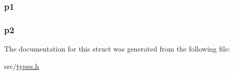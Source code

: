 \subsubsection[{\texorpdfstring{p1}{p1}}]{ p1}\hypertarget{struct_m_b_r_aece77b6cba572ad1536ef0f6ce20cb82}{}\label{struct_m_b_r_aece77b6cba572ad1536ef0f6ce20cb82}
\subsubsection[{\texorpdfstring{p2}{p2}}]{ p2}\hypertarget{struct_m_b_r_a51a95439187066c7cc5f32a60cdef5a6}{}\label{struct_m_b_r_a51a95439187066c7cc5f32a60cdef5a6}


The documentation for this struct was generated from the following file\+:\begin{DoxyCompactItemize}
\item 
src/\hyperlink{types_8h}{types.\+h}\end{DoxyCompactItemize}
